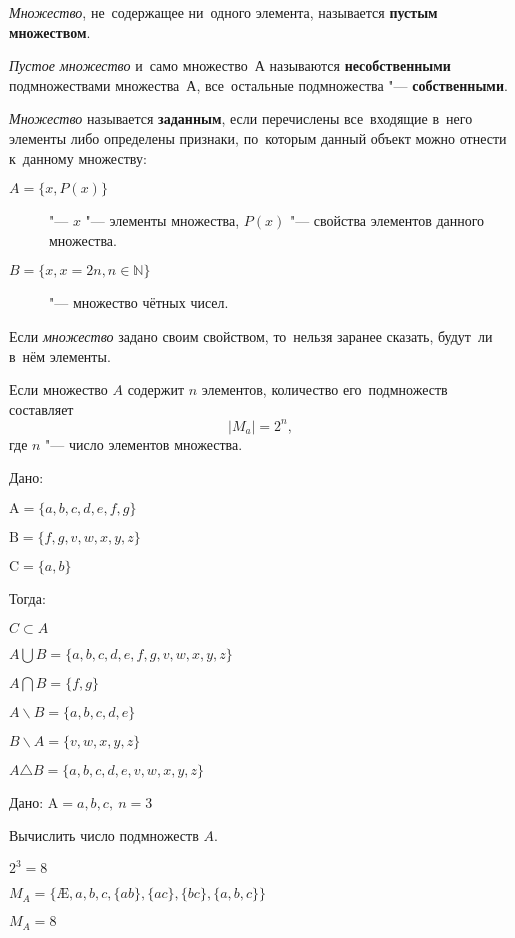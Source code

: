 \documentclass[]{scrartcl}
\begin{document}
\emph{Множество}, не~содержащее ни~одного элемента, называется \textbf{пустым множеством}.

\emph{Пустое множество} и~само множество~$А$ называются \textbf{несобственными} подмножествами множества~$А$, все~остальные подмножества "--- \textbf{собственными}.

\emph{Множество} называется \textbf{заданным}, если перечислены все~входящие в~него элементы либо определены признаки, по~которым данный объект можно отнести к~данному множеству:
\begin{description}
	\item[$A=\{x, P(x)\}$] "--- $x$ "--- элементы множества, $P(x)$ "--- свойства элементов данного множества.
	\item[$B=\{x, x=2n, n \in \mathbb{N}\}$] "--- множество чётных чисел.
\end{description}

Если \emph{множество} задано своим свойством, то~нельзя заранее сказать, будут~ли в~нём элементы.

Если множество $A$ содержит $n$ элементов, количество его~подмножеств составляет
\begin{equation}\label{n-submultitudes}
|M_{a}| = 2^n,
\end{equation}
где $n$ "--- число элементов множества.

\begin{Thexmpl}
	Дано:
	
	$\text{A}={\{a, b, c, d, e, f ,g\}}$
	
	$\text{B}={\{f, g, v, w, x, y, z\}}$
	
	$\text{C}={\{a, b\}}$
	
	Тогда:
	
	$C \subset A$
	
	$A \bigcup B = {\{a, b, c, d, e, f, g, v, w, x, y, z\}}$
	
	$A \bigcap B = {\{f, g\}}$
	
	$A \backslash B = {\{a, b, c, d, e\}}$
	
	$B \backslash A = {\{v, w, x, y, z\}}$
	
	$A \triangle B = {\{a, b, c, d, e, v, w, x, y, z\}}$
\end{Thexmpl}


\begin{Thexmpl}
	Дано: $\text{A}={{a, b, c}},\ n = 3$
	
	Вычислить число подмножеств $A$.
	
	$2^3 = 8$
	
	$M_A = \{\text{\AE{}}, a, b, c, \{ab\}, \{ac\}, \{bc\}, \{a,b,c\}\}$
	
	$M_A = 8$
\end{Thexmpl}
\end{document}
